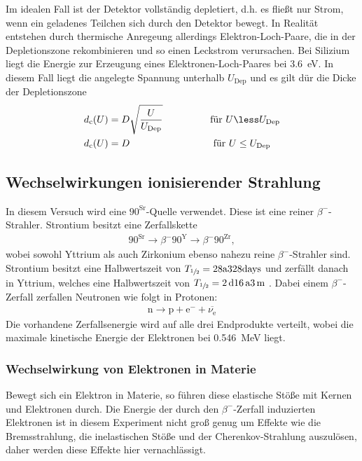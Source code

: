 Im idealen Fall ist der Detektor vollständig depletiert, d.h. es fließt nur Strom,
wenn ein geladenes Teilchen sich durch den Detektor bewegt. In Realität entstehen
durch thermische Anregeung allerdings Elektron-Loch-Paare, die in der Depletionszone
rekombinieren und so einen Leckstrom verursachen. Bei Silizium liegt die Energie
zur Erzeugung eines Elektronen-Loch-Paares bei \SI{3.6}{\electronvolt}.
In diesem Fall liegt die angelegte Spannung unterhalb $U_\text{Dep}$ und es gilt
dür die Dicke der Depletionszone
\begin{align}
  d_\text{c}(U) &= D\sqrt{\frac{U}{U_\text{Dep}}} \hspace{1.7cm}\text{für } U \less U_\text{Dep} \\
  d_\text{c}(U) &= D \hspace{3cm}\text{für } U \le U_\text{Dep}
\end{align}


\subsection{Wechselwirkungen ionisierender Strahlung}
In diesem Versuch wird eine ${90}^\text{Sr}$-Quelle verwendet. Diese ist eine reiner
$\beta^{-}$-Strahler. Strontium besitzt eine Zerfallskette
\begin{align}
  {90}^\text{Sr} \rightarrow{\beta^{-}} {90}^\text{Y} \rightarrow{\beta^{-}} {90}^\text{Zr},
\end{align}
wobei sowohl Yttrium als auch Zirkonium ebenso nahezu reine $\beta^{-}$-Strahler
sind. Strontium besitzt eine Halbwertszeit von $T_{\sfrac{1}{2}} = \num{28}\text{a}\num{328}\text{days}$
und zerfällt danach in Yttrium, welches eine Halbwertszeit von
$T_{\sfrac{1}{2}} = \num{2}\,\text{d}\num{16}\,\text{a}\num{3}\,\text{m}$ .
Dabei einem $\beta^{-}$-Zerfall zerfallen Neutronen wie folgt in Protonen:
\begin{align}
  \text{n} \rightarrow \text{p} + \text{e}^{-} + \overline{\nu_\text{e}}
\end{align}
Die vorhandene Zerfallsenergie wird auf alle drei Endprodukte verteilt, wobei die maximale
kinetische Energie der Elektronen bei \SI{0.546}{\mega\electronvolt} liegt.

\subsubsection{Wechselwirkung von Elektronen in Materie}
Bewegt sich ein Elektron in Materie, so führen diese elastische Stöße mit Kernen und
Elektronen durch. Die Energie der durch den $\beta^{-}$-Zerfall induzierten Elektronen
ist in diesem Experiment nicht groß genug um Effekte wie die Bremsstrahlung, die
inelastischen Stöße und der Cherenkov-Strahlung auszulösen, daher werden
diese Effekte hier vernachlässigt.

